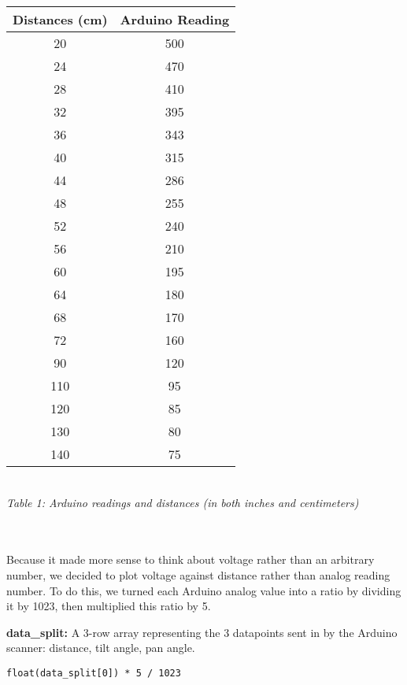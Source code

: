 \documentclass{article}
\begin{document}
    \begin{center}
    \begin{tabular}{ |c|c| } 
        \hline
        Distances (cm) & Arduino Reading \\
        \hline
        20 & 500 \\
        24 & 470 \\
        28 & 410 \\
        32 & 395 \\
        36 & 343 \\
        40 & 315 \\
        44 & 286 \\
        48 & 255 \\
        52 & 240 \\
        56 & 210 \\
        60 & 195 \\
        64 & 180 \\
        68 & 170 \\
        72 & 160 \\
        90 & 120 \\
        110 & 95 \\
        120 & 85 \\
        130 & 80 \\
        140 & 75 \\
        \hline
    \end{tabular}
    \vspace{3 mm}
    \\
    \textit{Table 1: Arduino readings and distances (in both inches and centimeters)}
    \end{center}

     \\
    \\
    Because it made more sense to think about voltage rather than an arbitrary number, we decided to plot voltage against distance rather than analog reading number. To do this, we turned each Arduino analog value into a ratio by dividing it by 1023, then multiplied this ratio by 5.

    \begin{tcolorbox}
    \textbf{data\_split:} A 3-row array representing the 3 datapoints sent in by the Arduino scanner: distance, tilt angle, pan angle.
\begin{verbatim}
float(data_split[0]) * 5 / 1023
\end{verbatim}
    \end{tcolorbox}
    
\end{document}
